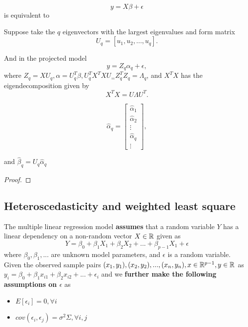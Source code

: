 \begin{refsection}
\begin{remark}

\end{remark}



\begin{lemma}\cite[355]{montgomery2012introduction}
	$$y = X\beta + \epsilon$$
	is equivalent to

	
	Suppose take the $q$ eigenvectors with the largest eigenvalues and form matrix	$$U_q = [u_1,u_2,...,u_q].$$
	
	And in the projected model
		$$y = Z_q\alpha_q + \epsilon,$$
	where $Z_q = XU_q, \alpha = U^T_q\beta, U^T_qX^TXU_ = Z^T_qZ_q = \Lambda_q$, and $X^TX$ has the eigendecomposition given by
	$$X^TX = U\Lambda U^T.$$	
	
	
	$$\hat{\alpha}_q = \begin{bmatrix}
	\hat{\alpha}_1\\
	\hat{\alpha}_2\\
	\vdots \\
	\hat{\alpha}_q\\
	\vdots
	\end{bmatrix},$$
	
	and $\hat{\beta}_q = U_q \hat{\alpha}_q$
\end{lemma}
\begin{proof}
	
\end{proof}


\subsection{Heteroscedasticity and weighted least square}
\begin{definition}
	The multiple linear regression model \textbf{assumes} that a random variable $Y$ has a linear dependency on a non-random vector $X \in \mathbb{R}$ given as
	$$Y = \beta_0 + \beta_1 X_1 +\beta_2 X_2 + ... +\beta_{p-1} X_1 + \epsilon$$
	where $\beta_0,\beta_1, ...$ are unknown model parameters, and $\epsilon$ is a random variable. 
	Given the observed sample pairs $(x_1,y_1),(x_2,y_2),..., (x_n,y_n), x\in \mathbb{R}^{p-1}, y\in \mathbb{R}$ as $y_i = \beta_0 + \beta_1 x_{i1} + \beta_2 x_{i2} + ... + \epsilon_i$ and we \textbf{further make the following assumptions on $\epsilon$} as
	\begin{itemize}
		\item $E[\epsilon_i] = 0,\forall i$
		\item $cov(\epsilon_i,\epsilon_j) = \sigma^2 \Sigma,\forall i,j$
	\end{itemize} 	
\end{definition}


\end{refsection}
